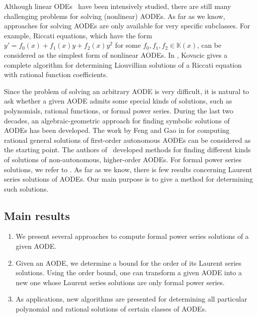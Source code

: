 \documentclass[10pt,a4paper]{article}
\begin{document}
Although linear ODEs~\cite{Ince1926} have been intensively studied, there are still many challenging problems for solving
(nonlinear) AODEs. As far as we know, approaches for solving AODEs are only available for very specific subclasses. 
For example, Riccati equations, 
which have the form $y'=f_0(x)+f_1(x)y+f_2(x)y^2$ for some $f_0,f_1,f_2 \in \mathbb{K}(x)$, %
can be considered as the simplest form of nonlinear AODEs. 
In \cite{Kovacic}, Kovacic gives a complete algorithm for determining Liouvillian solutions of 
a Riccati equation with rational function coefficients. 

Since the problem of solving an arbitrary AODE is very difficult, 
it is natural to ask whether a given AODE admits some special kinds of solutions, 
such as polynomials, rational functions, or formal power series. 
During the last two decades, an algebraic-geometric approach for finding symbolic solutions of AODEs has been developed. 
The work by Feng and Gao in \cite{FengGao, FengGao06} for computing rational general solutions of first-order autonomous AODEs 
can be considered as the starting point. 
The authors of~\cite{NgoWinkler11b, GraseggerThesis, VoWinkler2015, VoGraseggerWinkler2017} 
developed methods for finding different kinds of solutions of non-autonomous, higher-order AODEs. 
For formal power series solutions, we refer to \cite{DenefLipshitz,SingerFormalSolutions}.
As far as we know, there is few results concerning Laurent series solutions of AODEs. 
Our main purpose is to give a method for determining such solutions.

\subsection{Main results}

\begin{enumerate}
 \item We present several approaches to compute formal power series solutions of a given AODE.
 \item Given an AODE, we determine a bound for the order of its Laurent series solutions. 
 Using the order bound, one can transform a given AODE into a new one whose Laurent series solutions are only formal power series.
 \item As applications, new algorithms are presented for determining all particular polynomial and rational solutions of certain classes of AODEs.
\end{enumerate}
\end{document}
